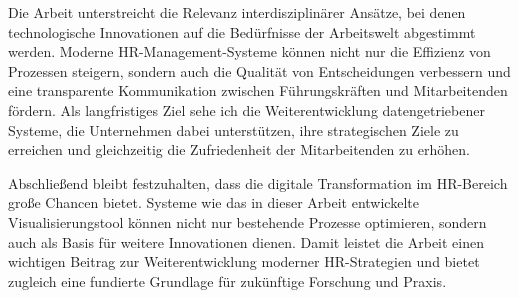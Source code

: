 Die Arbeit unterstreicht die Relevanz interdisziplinärer Ansätze, bei denen technologische Innovationen auf die Bedürfnisse der Arbeitswelt abgestimmt werden. Moderne HR-Management-Systeme können nicht nur die Effizienz von Prozessen steigern, sondern auch die Qualität von Entscheidungen verbessern und eine transparente Kommunikation zwischen Führungskräften und Mitarbeitenden fördern. Als langfristiges Ziel sehe ich die Weiterentwicklung datengetriebener Systeme, die Unternehmen dabei unterstützen, ihre strategischen Ziele zu erreichen und gleichzeitig die Zufriedenheit der Mitarbeitenden zu erhöhen.

Abschließend bleibt festzuhalten, dass die digitale Transformation im HR-Bereich große Chancen bietet. Systeme wie das in dieser Arbeit entwickelte Visualisierungstool können nicht nur bestehende Prozesse optimieren, sondern auch als Basis für weitere Innovationen dienen. Damit leistet die Arbeit einen wichtigen Beitrag zur Weiterentwicklung moderner HR-Strategien und bietet zugleich eine fundierte Grundlage für zukünftige Forschung und Praxis.
